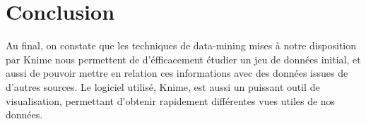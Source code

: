 

\section{Conclusion}

Au final, on constate que les techniques de data-mining mises à notre disposition par Knime nous permettent de d'éfficacement étudier un jeu de données initial, et aussi de pouvoir mettre en relation ces informations avec des données issues de d'autres sources. Le logiciel utilisé, Knime, est aussi un puissant outil de visualisation, permettant d'obtenir rapidement différentes vues utiles de nos données.
